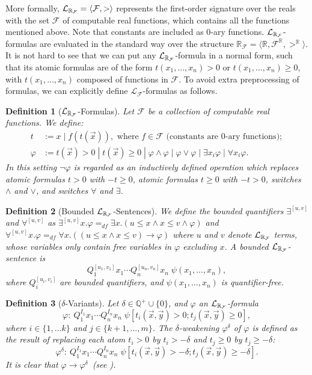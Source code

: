 \documentclass[journal]{IEEEtran}
\newtheorem{definition}{Definition}
\begin{document}
More formally, $\mathcal{L}_{\mathbb{R}_{\mathcal{F}}} = \langle \mathcal{F}, > \rangle$ represents the first-order signature over the reals with the set $\mathcal{F}$ of computable real functions, which contains all the functions mentioned above. Note that constants are included as 0-ary functions. $\mathcal{L}_{\mathbb{R}_{\mathcal{F}}}$-formulas are evaluated in the standard way over the structure $\mathbb{R}_{\mathcal{F}}= \langle \mathbb{R}, \mathcal{F}^{\mathbb{R}}, >^{\mathbb{R}}\rangle$. It is not hard to see that  we can put any $\mathcal{L}_{\mathbb{R}_{\mathcal{F}}}$-formula in a normal form, such that its atomic formulas are of the form $t(x_1,...,x_n)>0$ or $t(x_1,...,x_n)\geq 0$, with $t(x_1,...,x_n)$ composed of functions in $\mathcal{F}$. To avoid extra preprocessing of formulas, we can explicitly define $\mathcal{L}_{\mathcal{F}}$-formulas as follows.
\begin{definition}[$\mathcal{L}_{\mathbb{R}_{\mathcal{F}}}$-Formulas]
Let $\mathcal{F}$ be a collection of computable real functions. We define:
\begin{align*}
t& := x \; | \; f(t(\vec x)), \mbox{ where }f\in \mathcal{F} \mbox{ (constants are 0-ary functions)};\\
\varphi& := t(\vec x)> 0 \; | \; t(\vec x)\geq 0 \; | \; \varphi\wedge\varphi
\; | \; \varphi\vee\varphi \; | \; \exists x_i\varphi \; |\; \forall x_i\varphi.
\end{align*}
In this setting $\neg\varphi$ is regarded as an inductively defined operation
which replaces atomic formulas $t>0$ with $-t\geq 0$, atomic formulas $t\geq 0$
with $-t>0$, switches $\wedge$ and $\vee$, and switches $\forall$ and $\exists$.
\end{definition}
\begin{definition}[Bounded $\mathcal{L}_{\mathbb{R}_{\mathcal{F}}}$-Sentences]
We define the bounded quantifiers $\exists^{[u,v]}$ and $\forall^{[u,v]}$ as
$\exists^{[u,v]}x.\varphi =_{df}\exists x. ( u \leq x \land x \leq v \wedge
\varphi)$ and $
\forall^{[u,v]}x.\varphi =_{df} \forall x. ( (u \leq x \land x \leq v)
\rightarrow \varphi)$
where $u$ and $v$ denote $\mathcal{L}_{\mathbb{R}_{\mathcal{F}}}$ terms, whose variables only
contain free variables in $\varphi$ excluding $x$. A {\em bounded $\mathcal{L}_{\mathbb{R}_{\mathcal{F}}}$-sentence} is
$$Q_1^{[u_1,v_1]}x_1\cdots Q_n^{[u_n,v_n]}x_n\;\psi(x_1,...,x_n),$$
where $Q_i^{[u_i,v_i]}$ are bounded quantifiers, and $\psi(x_1,...,x_n)$ is
quantifier-free.
\end{definition}
\begin{definition}[$\delta$-Variants]\label{variants}
Let $\delta\in \mathbb{Q}^+\cup\{0\}$, and $\varphi$ an
$\mathcal{L}_{\mathbb{R}_{\mathcal{F}}}$-formula
$$\varphi: \ Q_1^{I_1}x_1\cdots Q_n^{I_n}x_n\;\psi[t_i(\vec x, \vec y)>0;
t_j(\vec x, \vec
y)\geq 0],$$ where $i\in\{1,...k\}$ and $j\in\{k+1,...,m\}$. The {\em
$\delta$-weakening} $\varphi^{\delta}$ of $\varphi$ is
defined as the result of replacing each atom $t_i > 0$ by $t_i >
-\delta$ and $t_j \geq 0$ by $t_j \geq -\delta$:
$$\varphi^{\delta}:\ Q_1^{I_1}x_1\cdots Q_n^{I_n}x_n\;\psi[t_i(\vec x, \vec
y)>-\delta; t_j(\vec x,
\vec y)\geq -\delta].$$
It is clear that $\varphi\rightarrow\varphi^{\delta}$~(see \cite{DBLP:conf/lics/GaoAC12}).
\end{definition}
\end{document}
